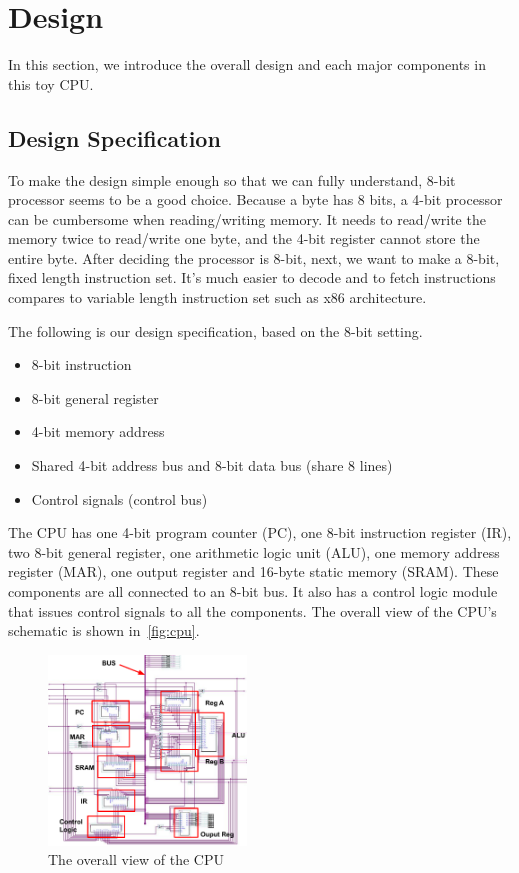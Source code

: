\section{Design}
\label{sec:design}
In this section, we introduce the overall design and each major components in this toy CPU.

\subsection{Design Specification}
To make the design simple enough so that we can fully understand, 8-bit processor seems to be a good choice. Because a byte has 8 bits, a 4-bit processor can be cumbersome when reading/writing memory. It needs to read/write the memory twice to read/write one byte, and the 4-bit register cannot store the entire byte. After deciding the processor is 8-bit, next, we want to make a 8-bit, fixed length instruction set. It's much easier to decode and to fetch instructions compares to variable length instruction set such as x86 architecture.

The following is our design specification, based on the 8-bit setting.

\begin{itemize}
	\item 8-bit instruction
	\item 8-bit general register
	\item 4-bit memory address
	\item Shared 4-bit address bus and 8-bit data bus (share 8 lines)
	\item Control signals (control bus)
\end{itemize}

The CPU has one 4-bit program counter (PC), one 8-bit instruction register (IR), two 8-bit general register, one arithmetic logic unit (ALU), one memory address register (MAR), one output register and 16-byte static memory (SRAM). These components are all connected to an 8-bit bus. It also has a control logic module that issues control signals to all the components. The overall view of the CPU's schematic is shown in~\autoref{fig:cpu}.  

\begin{figure}[th]
	\includegraphics[width=0.47\textwidth]{figures/cpu}
	\centering
	\caption{The overall view of the CPU}
	\label{fig:cpu}
\end{figure}

